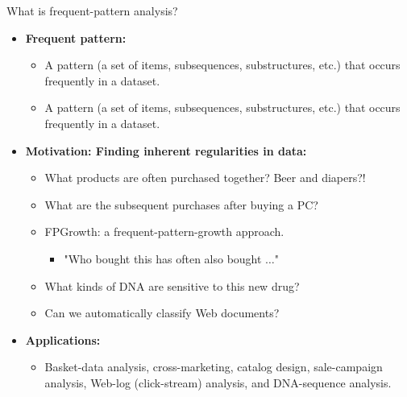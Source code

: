 \documentclass[aspectratio=169,t]{beamer}
\begin{document}
  { 
    \begin{frame}{What is frequent-pattern analysis?}
        \begin{itemize}
            \item \textbf{Frequent pattern:}
            \begin{itemize}
              \item A pattern (a set of items, subsequences, substructures, etc.) that occurs frequently in a dataset.
              \item A pattern (a set of items, subsequences, substructures, etc.) that occurs frequently in a dataset.
            \end{itemize}
            \item \textbf{Motivation: Finding inherent regularities in data:}
            \begin{itemize}
              \item What products are often purchased together? Beer and diapers?!
              \item What are the subsequent purchases after buying a PC?
              \item FPGrowth: a frequent-pattern-growth approach.
              \begin{itemize}
                \item "Who bought this has often also bought $\ldots$"
              \end{itemize}
              \item What kinds of DNA are sensitive to this new drug?
              \item Can we automatically classify Web documents?
            \end{itemize}
            \item \textbf{Applications:}
            \begin{itemize}
              \item Basket-data analysis, cross-marketing, catalog design, sale-campaign analysis, Web-log (click-stream) analysis, and DNA-sequence analysis.
            \end{itemize}
        \end{itemize}
    \end{frame}
  }
\end{document}
